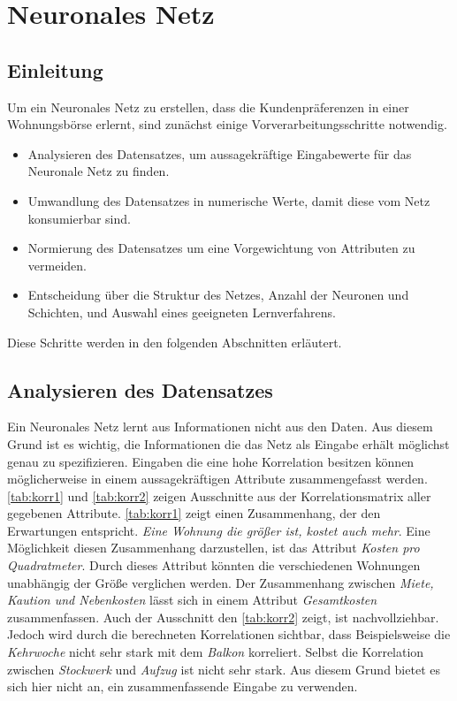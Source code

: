 \section{Neuronales Netz}\label{sec:kaptiel}
\subsection{Einleitung}
Um ein Neuronales Netz zu erstellen, dass die Kundenpräferenzen in einer Wohnungsbörse erlernt,
sind zunächst einige Vorverarbeitungsschritte notwendig.
\begin{itemize}
    \item Analysieren des Datensatzes, um aussagekräftige Eingabewerte für das Neuronale Netz zu
            finden.
    \item Umwandlung des Datensatzes in numerische Werte, damit diese vom Netz konsumierbar sind.
    \item Normierung des Datensatzes um eine Vorgewichtung von Attributen zu vermeiden.
    \item Entscheidung über die Struktur des Netzes, Anzahl der Neuronen und Schichten, und Auswahl 
            eines geeigneten Lernverfahrens.
\end{itemize}
Diese Schritte werden in den folgenden Abschnitten erläutert. 

\subsection{Analysieren des Datensatzes}
Ein Neuronales Netz lernt aus Informationen nicht aus den Daten. Aus diesem Grund ist es wichtig, 
die Informationen die das Netz als Eingabe erhält möglichst genau zu spezifizieren. Eingaben die 
eine hohe Korrelation besitzen können möglicherweise in einem aussagekräftigen Attribute
zusammengefasst werden. 
\autoref{tab:korr1} und \autoref{tab:korr2} zeigen Ausschnitte aus der Korrelationsmatrix aller 
gegebenen Attribute. 
\autoref{tab:korr1} zeigt einen Zusammenhang, der den Erwartungen entspricht. \textit{Eine Wohnung die größer ist, kostet auch mehr}.
Eine Möglichkeit diesen Zusammenhang darzustellen, ist das Attribut \textit{Kosten pro Quadratmeter}. Durch dieses Attribut
könnten die verschiedenen Wohnungen unabhängig der Größe verglichen werden. Der Zusammenhang zwischen \textit{Miete, Kaution und Nebenkosten}
lässt sich in einem Attribut \textit{Gesamtkosten} zusammenfassen.
Auch der Ausschnitt den \autoref{tab:korr2} zeigt, ist nachvollziehbar. Jedoch wird durch die berechneten Korrelationen sichtbar, 
dass Beispielsweise die \textit{Kehrwoche} nicht sehr stark mit dem \textit{Balkon} korreliert. Selbst die Korrelation zwischen
\textit{Stockwerk} und \textit{Aufzug} ist nicht sehr stark. Aus diesem Grund bietet es sich hier nicht an, ein zusammenfassende 
Eingabe zu verwenden.

